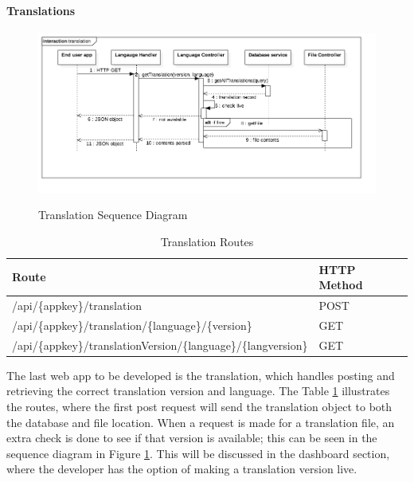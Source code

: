 \paragraph{Translations}

\begin{figure}[!h]
    \caption{Translation Sequence Diagram}
    \centering
    \includegraphics[width=150mm]{images/sequence/translation}
    \label{fig:translation-s}
\end{figure}

\begin{table}[!h]
\centering
\caption{Translation Routes}
\label{tb:translation-routes}
\begin{tabular}{|l|l|}
\hline
\rowcolor{green!20}
Route                                        & HTTP Method \\ \hline
/api/\{appkey\}/translation                  & POST        \\ \hline
/api/\{appkey\}/translation/\{language\}/\{version\}           & GET         \\ \hline
/api/\{appkey\}/translationVersion/\{language\}/\{langversion\} & GET         \\ \hline
\end{tabular}
\end{table}

The last web app to be developed is the translation, which handles posting and retrieving the correct translation version and language. The Table \ref{tb:translation-routes} illustrates the routes, where the first post request will send the translation object to both the database and file location. When a request is made for a translation file, an extra check is done to see if that version is available; this can be seen in the sequence diagram in Figure \ref{fig:translation-s}. This will be discussed in the dashboard section, where the developer has the option of making a translation version live.

